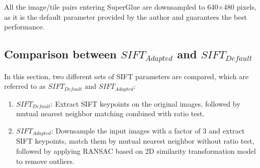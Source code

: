 All the image/tile pairs entering SuperGlue are downsampled to 640$\times$480 pixels, as it is the default parameter provided by the author and guarantees the best performance. 


\subsection{Comparison between $SIFT_{Adapted}$ and $SIFT_{Default}$}
\label{Compare2SIFTs}
In this section, two different sets of SIFT parameters are compared, which are referred to as $SIFT_{Default}$ and $SIFT_{Adapted}$:\\
\begin{enumerate}
	\item \textbf{$SIFT_{Default}$}: Extract SIFT keypoints on the original images, followed by mutual nearest neighbor matching combined with ratio test.%
	\item \textbf{$SIFT_{Adapted}$}: Downsample the input images with a factor of 3 and extract SIFT keypoints, match them by mutual nearest neighbor without ratio test, followed by applying RANSAC based on 2D similarity transformation model to remove outliers.
\end{enumerate}


